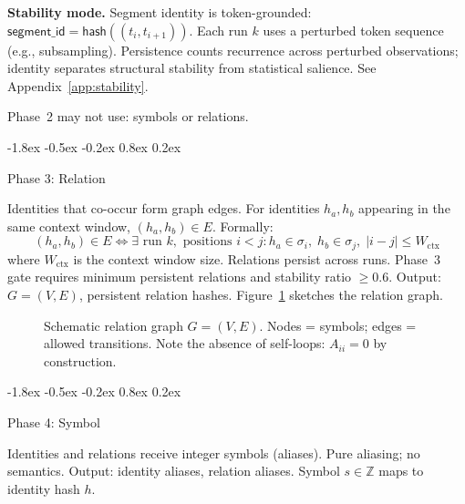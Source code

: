 \documentclass[10pt]{article}
\makeatletter
\renewcommand{\subsection}{\@startsection{subsection}{2}{\z@}%
  {-1.8ex \@plus -0.5ex \@minus -0.2ex}%
  {0.8ex \@plus 0.2ex}%
  {\normalsize\bfseries\raggedright}}
\makeatother
\begin{document}
\textbf{Stability mode.}
Segment identity is token-grounded:
$\mathsf{segment\_id} = \mathsf{hash}((t_i, t_{i+1}))$. Each run $k$ uses a perturbed
token sequence (e.g., subsampling). Persistence counts recurrence across perturbed
observations; identity separates structural stability from statistical salience. See
Appendix~\ref{app:stability}.

Phase~2 may not use: symbols or relations.

\subsection{Phase 3: Relation}

Identities that co-occur form graph edges. For identities $h_a, h_b$ appearing in the
same context window, $(h_a, h_b) \in E$. Formally:
\begin{equation}
(h_a, h_b) \in E \iff \exists \text{ run } k, \text{ positions } i < j:
  h_a \in \sigma_i, \; h_b \in \sigma_j, \; |i - j| \leq W_{\text{ctx}}
\end{equation}
where $W_{\text{ctx}}$ is the context window size. Relations persist across runs.
Phase~3 gate requires minimum persistent relations and stability ratio $\geq 0.6$.
Output: $G = (V, E)$, persistent relation hashes.
Figure~\ref{fig:graph} sketches the relation graph.

\begin{figure}[t]
\centering
{}
\caption{Schematic relation graph $G=(V,E)$. Nodes = symbols; edges = allowed transitions. Note the absence of self-loops: $A_{ii} = 0$ by construction.}
\label{fig:graph}
\end{figure}

\subsection{Phase 4: Symbol}

Identities and relations receive integer symbols (aliases). Pure aliasing; no
semantics. Output: identity aliases, relation aliases. Symbol $s \in \mathbb{Z}$ maps
to identity hash $h$.
\end{document}
